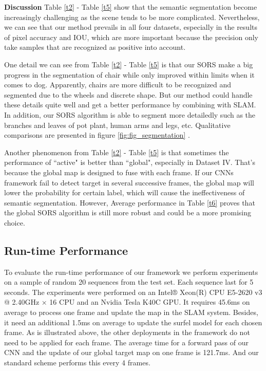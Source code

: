 \documentclass[conference]{IEEEtran}
\begin{document}
\textbf{Discussion}  
Table \ref{t2} - Table \ref{t5} show that the semantic segmentation become increasingly challenging as the scene tends to be more complicated. Nevertheless, we can see that our method prevails in all four datasets, especially in the results of pixel accuracy and IOU, which are more important because the precision only take samples that are recognized as positive into account.

One detail we can see from Table \ref{t2} - Table \ref{t5} is that our SORS make a big progress in the segmentation of chair while only improved within limits when it comes to dog. Apparently, chairs are more difficult to be recognized and segmented due to the wheels and discrete shape. But our method could handle these details quite well and get a better performance by combining with SLAM. In addition, our SORS algorithm is able to segment more detailedly such as the branches and leaves of pot plant, human arms and legs, etc. Qualitative comparisons are presented in figure \ref{fig:fig_segmentation} .

Another phenomenon from Table \ref{t2} - Table \ref{t5} is that sometimes the performance of ``active" is better than ``global", especially in Dataset IV. That's because the global map is designed to fuse with each frame. If our CNNs framework fail to detect target in several successive frames, the global map will  lower the probability for certain label, which will cause the ineffectiveness of semantic segmentation. However, Average performance in Table \ref{t6} proves that the global SORS algorithm is still more robust and could be a more promising choice.


{\color{blue}\subsection{\textbf{Run-time Performance}}

To evaluate the run-time performance of our framework we perform experiments on a sample of random 20 sequences from the test set. Each sequence last for 5 seconds. The experiments were performed on an Intel® Xeon(R) CPU E5-2620 v3 @ 2.40GHz × 16 CPU and an Nvidia Tesla K40C GPU. It requires 45.6ms on average to process one frame and update the map in the SLAM system. Besides, it need an additional 1.5ms on average to update the surfel model for each chosen frame. As is illustrated above, the other deployments in the framework do not need to be applied for each frame. The average time for a forward pass of our CNN and the update of our global target map on one frame is 121.7ms. And our standard scheme performs this every 4 frames.}
\end{document}
